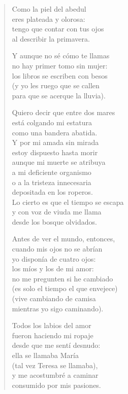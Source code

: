 \documentclass[12pt]{article}
\begin{document}
\clearpage
{}
\begin{verse}

Como la piel del abedul\\
eres plateada y olorosa:\\
tengo que contar con tus ojos\\
al describir la primavera.  

Y aunque no sé cómo te llamas\\
no hay primer tomo sin mujer:\\
los libros se escriben con besos\\
(y yo les ruego que se callen\\
para que se acerque la lluvia).  

Quiero decir que entre dos mares\\
está colgando mi estatura\\
como una bandera abatida.\\
Y por mi amada sin mirada\\
estoy dispuesto hasta morir\\
aunque mi muerte se atribuya\\
a mi deficiente organismo\\
o a la tristeza innecesaria\\
depositada en los roperos.\\
Lo cierto es que el tiempo se escapa\\
y con voz de viuda me llama\\
desde los bosque olvidados.  

Antes de ver el mundo, entonces,\\
cuando mis ojos no se abrían\\
yo disponía de cuatro ojos:\\
los míos y los de mi amor:\\
no me pregunten si he cambiado\\
(es solo el tiempo el que envejece)\\
(vive cambiando de camisa\\
mientras yo sigo caminando).  

Todos los labios del amor\\
fueron haciendo mi ropaje\\
desde que me sentí desnudo:\\
ella se llamaba María\\
(tal vez Teresa se llamaba),\\
y me acostumbré a caminar\\
consumido por mis pasiones.  


\end{verse}
\end{document}

